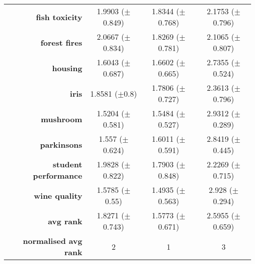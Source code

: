 \begin{table}[htb]
{\begin{tabular}{r|ccc}
                  \textbf{fish toxicity}       & \cellcolor[rgb]{ 1,  .922,  .518}1.9903 ($\pm$0.849)       & \cellcolor[rgb]{ .388,  .745,  .482}1.8344 ($\pm$0.768) & \cellcolor[rgb]{ .973,  .412,  .42}2.1753 ($\pm$0.796) \\
                  \textbf{forest fires}        & \cellcolor[rgb]{ 1,  .922,  .518}2.0667 ($\pm$0.834)       & \cellcolor[rgb]{ .388,  .745,  .482}1.8269 ($\pm$0.781) & \cellcolor[rgb]{ .973,  .412,  .42}2.1065 ($\pm$0.807) \\
                  \textbf{housing}             & \cellcolor[rgb]{ .388,  .745,  .482}1.6043 ($\pm$0.687)    & \cellcolor[rgb]{ 1,  .922,  .518}1.6602 ($\pm$0.665)    & \cellcolor[rgb]{ .973,  .412,  .42}2.7355 ($\pm$0.524) \\
                  \textbf{iris}                & \cellcolor[rgb]{ 1,  .922,  .518}1.8581 ($\pm$0.8)         & \cellcolor[rgb]{ .388,  .745,  .482}1.7806 ($\pm$0.727) & \cellcolor[rgb]{ .973,  .412,  .42}2.3613 ($\pm$0.796) \\
                  \textbf{mushroom}            & \cellcolor[rgb]{ .388,  .745,  .482}1.5204 ($\pm$0.581)    & \cellcolor[rgb]{ 1,  .922,  .518}1.5484 ($\pm$0.527)    & \cellcolor[rgb]{ .973,  .412,  .42}2.9312 ($\pm$0.289) \\
                  \textbf{parkinsons}          & \cellcolor[rgb]{ .388,  .745,  .482}1.557 ($\pm$0.624)     & \cellcolor[rgb]{ 1,  .922,  .518}1.6011 ($\pm$0.591)    & \cellcolor[rgb]{ .973,  .412,  .42}2.8419 ($\pm$0.445) \\
                  \textbf{student performance} & \cellcolor[rgb]{ 1,  .922,  .518}1.9828 ($\pm$0.822)       & \cellcolor[rgb]{ .388,  .745,  .482}1.7903 ($\pm$0.848) & \cellcolor[rgb]{ .973,  .412,  .42}2.2269 ($\pm$0.715) \\
                  \textbf{wine quality}        & \cellcolor[rgb]{ 1,  .922,  .518}1.5785 ($\pm$0.55)        & \cellcolor[rgb]{ .388,  .745,  .482}1.4935 ($\pm$0.563) & \cellcolor[rgb]{ .973,  .412,  .42}2.928 ($\pm$0.294)  \\
                  \midrule
                  \textbf{avg rank}            & \cellcolor[rgb]{ 1,  .922,  .518}1.8271 ($\pm$0.743)       & \cellcolor[rgb]{ .388,  .745,  .482}1.5773 ($\pm$0.671) & \cellcolor[rgb]{ .973,  .412,  .42}2.5955 ($\pm$0.659) \\
                  \midrule
                  \textbf{normalised avg rank} & \cellcolor[rgb]{ 1,  .922,  .518}2                         & \cellcolor[rgb]{ .388,  .745,  .482}1                   & \cellcolor[rgb]{ .973,  .412,  .42}3                   \\
            \end{tabular}%
      }
\end{table}%

